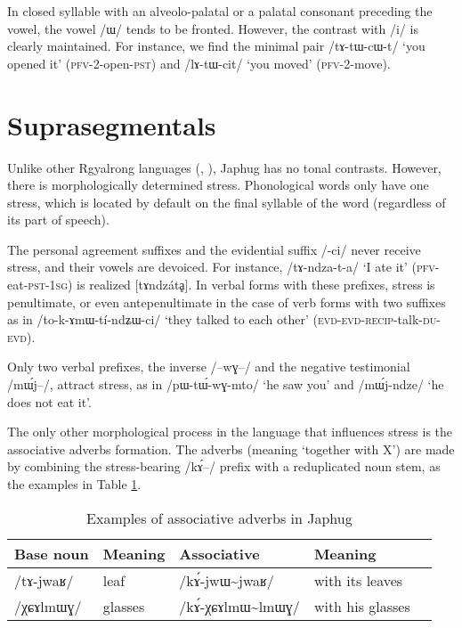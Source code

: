 \documentclass[oldfontcommands,oneside,a4paper,11pt]{article}
\newcommand{\ipa}[1]{{\phon/#1/}} %
\begin{document}
In closed syllable with an alveolo-palatal or a palatal consonant preceding the vowel, the vowel \ipa{ɯ} tends to be fronted. However, the contrast with \ipa{i} is clearly maintained. For instance, we find the minimal pair \ipa{tɤ-tɯ-cɯ-t} `you opened it' (\textsc{pfv}-2-open-\textsc{pst}) and \ipa{lɤ-tɯ-cit} `you moved' (\textsc{pfv}-2-move).
    
     \section{Suprasegmentals}
Unlike other Rgyalrong languages (\citealt{jackson05yingao}, \citealt{linyj12tone}), Japhug has no tonal contrasts. However, there is morphologically determined stress. Phonological words only have one stress, which is located by default on the final syllable of the word (regardless of its part of speech).

The personal agreement suffixes and the evidential suffix \ipa{-ci} never receive stress, and their vowels are devoiced. For instance, \ipa{tɤ-ndza-t-a} `I ate it' (\textsc{pfv}-eat-\textsc{pst-1sg}) is realized [tɤndzátḁ]. In verbal forms with these prefixes, stress is penultimate, or even antepenultimate in the case of verb forms with two suffixes as in \ipa{to-k-ɤmɯ-tí-ndʑɯ-ci} `they talked to each other' (\textsc{evd}-\textsc{evd}-\textsc{recip}-talk-\textsc{du-evd}).

Only two verbal prefixes, the inverse \ipa{--wɣ--} and the negative testimonial \ipa{mɯ́j--}, attract stress, as in \ipa{pɯ-tɯ́-wɣ-mto} `he saw you' and \ipa{mɯ́j-ndze} `he does not eat it'.
         
The only other morphological process in the language that influences stress is the  associative adverbs formation. The adverbs (meaning `together with X') are made by combining the stress-bearing \ipa{kɤ́--}  prefix with a reduplicated noun stem, as the examples in Table \ref{tab:assoc.adv}.

\begin{table}
 \caption{Examples of associative adverbs in Japhug} \label{tab:assoc.adv}  \centering
\begin{tabular}{lllll}
\toprule
Base noun & Meaning & Associative & Meaning \\
\midrule
\ipa{tɤ-jwaʁ} & leaf & \ipa{kɤ́-jwɯ\textasciitilde{}jwaʁ} & with its leaves\\
\ipa{χɕɤlmɯɣ} & glasses & \ipa{kɤ́-χɕɤlmɯ\textasciitilde{}lmɯɣ} & with his glasses\\
\bottomrule
\end{tabular}
\end{table}
         
\end{document}
